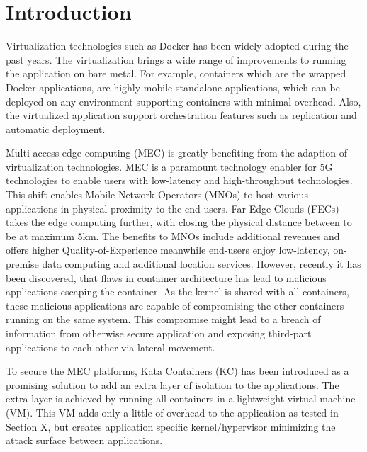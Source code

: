 \chapter{Introduction}
\label{chapter:intro}



Virtualization technologies such as Docker has been widely adopted during the past years. The virtualization brings a wide range of improvements to running the application on bare metal. For example, containers which are the wrapped Docker applications, are highly mobile standalone applications, which can be deployed on any environment supporting containers with minimal overhead. Also, the virtualized application support orchestration features such as replication and automatic deployment.


Multi-access edge computing (MEC) is greatly benefiting from the adaption of virtualization technologies. MEC is a paramount technology enabler for 5G technologies to enable users with low-latency and high-throughput technologies. This shift enables Mobile Network Operators (MNOs) to host various applications in physical proximity to the end-users. Far Edge Clouds (FECs) takes the edge computing further, with closing the physical distance between to be at maximum 5km. The benefits to MNOs include additional revenues and offers higher Quality-of-Experience meanwhile end-users enjoy low-latency, on-premise data computing and additional location services. However, recently it has been discovered, that flaws in container architecture has lead to malicious applications escaping the container. As the kernel is shared with all containers, these malicious applications are capable of compromising the other containers running on the same system. This compromise might lead to a breach of information from otherwise secure application and exposing third-part applications to each other via lateral movement.

To secure the MEC platforms, Kata Containers (KC) \cite{KataContainers} has been introduced as a promising solution to add an extra layer of isolation to the applications. The extra layer is achieved by running all containers in a lightweight virtual machine (VM). This VM adds only a little of overhead to the application as tested in Section X, but creates application specific kernel/hypervisor minimizing the attack surface between applications.


